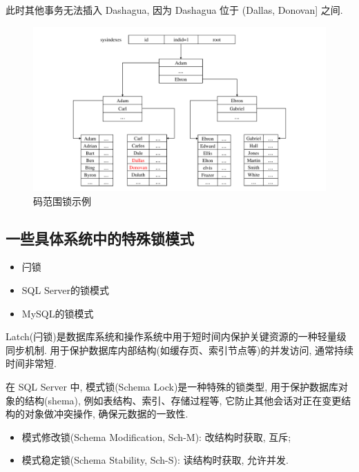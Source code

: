 此时其他事务无法插入 Dashagua, 因为 Dashagua 位于 (Dallas, Donovan] 之间.

\begin{figure}[H]
    \centering
    \includegraphics[width=.9\textwidth]{figure/码范围锁.pdf}
    \caption{码范围锁示例}
    \label{fig:key-range}
\end{figure}

\subsection{一些具体系统中的特殊锁模式}

\begin{itemize}
  \item 闩锁
  \item SQL Server的锁模式
  \item MySQL的锁模式
\end{itemize}

Latch(闩锁)是数据库系统和操作系统中用于短时间内保护关键资源的一种轻量级同步机制. 
用于保护数据库内部结构(如缓存页、索引节点等)的并发访问, 通常持续时间非常短.

在 SQL Server 中, 模式锁(Schema Lock)是一种特殊的锁类型, 用于保护数据库对象的结构(shema), 例如表结构、索引、存储过程等, 它防止其他会话对正在变更结构的对象做冲突操作, 确保元数据的一致性.
\begin{itemize}
  \item 模式修改锁(Schema Modification, Sch-M): 改结构时获取, 互斥;
  \item 模式稳定锁(Schema Stability, Sch-S): 读结构时获取, 允许并发.
\end{itemize}

